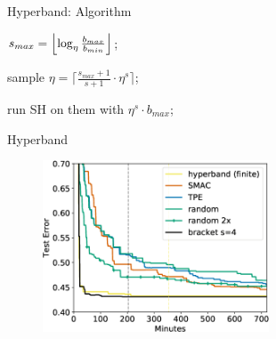 \begin{frame}{Hyperband: Algorithm}
\begin{minipage}{0.75\textwidth}
\begin{algorithm}[H]
    \LinesNumbered
    \SetAlgoLined
    \setcounter{AlgoLine}{0}
    \DeclarePairedDelimiter\ceil{\lceil}{\rceil}
    \DeclarePairedDelimiter\floor{\lfloor}{\rfloor}
    
    
    $s_{max}=\floor*{\log_{\eta}\frac{b_{max}}{b_{min}}}$;\
    
    {
        sample $\eta=\lceil\frac{s_{max}+1}{s+1} \cdot\eta^{s}\rceil$;\
        
        run SH on them with $\eta^{s}\cdot b_{max}$;\
    }
 
        
    
    \caption{Pseudocode for Hyperband using SuccessiveHalving (SH) as a subroutine}
\end{algorithm}
\end{minipage}
\end{frame}
\begin{frame}{Hyperband}
\begin{figure}
    \centering
    \includegraphics[width=0.6\textwidth]{images/hyperband/Figure_experiments.png}
\end{figure}

    
\end{frame}

